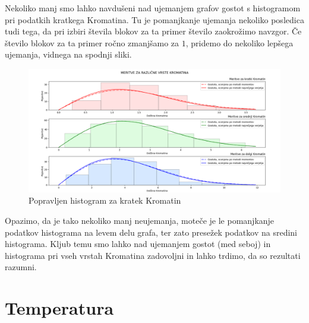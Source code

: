 \documentclass{article}
\begin{document}
Nekoliko manj smo lahko navdušeni nad ujemanjem grafov gostot s histogramom pri podatkih kratkega Kromatina. Tu je pomanjkanje ujemanja nekoliko posledica tudi tega, da pri izbiri števila blokov za ta primer število zaokrožimo navzgor.
Če število blokov za ta primer ročno zmanjšamo za $1$, pridemo do nekoliko lepšega ujemanja, vidnega na spodnji sliki.
\begin{figure}[H]
    \begin{center}
    \includegraphics[width=\linewidth]{naloga2ff.png}
    \vspace*{-5mm}\caption{Popravljen histogram za kratek Kromatin}
    \end{center}    
\end{figure}
Opazimo, da je tako nekoliko manj neujemanja, moteče je le pomanjkanje podatkov histograma na levem delu grafa, ter zato presežek podatkov na sredini histograma. 
Kljub temu smo lahko nad ujemanjem gostot (med seboj) in histograma pri vseh vrstah Kromatina zadovoljni in lahko trdimo, da so rezultati razumni.

\pagebreak

\section{Temperatura}
\end{document}
